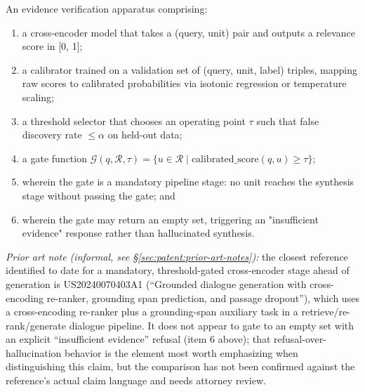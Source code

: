 \begin{claim}
\label{claim:evidence-gate}
An evidence verification apparatus comprising:
\begin{enumerate}
  \item a cross-encoder model that takes a (query, unit) pair and outputs a relevance score in [0, 1];
  \item a calibrator trained on a validation set of (query, unit, label) triples, mapping raw scores to calibrated probabilities via isotonic regression or temperature scaling;
  \item a threshold selector that chooses an operating point $\tau$ such that false discovery rate $\leq \alpha$ on held-out data;
  \item a gate function $\mathcal{G}(q, \mathcal{R}, \tau) = \{ u \in \mathcal{R} \mid \text{calibrated\_score}(q, u) \geq \tau \}$;
  \item wherein the gate is a mandatory pipeline stage: no unit reaches the synthesis stage without passing the gate; and
  \item wherein the gate may return an empty set, triggering an "insufficient evidence" response rather than hallucinated synthesis.
\end{enumerate}
\end{claim}

\par\noindent\emph{Prior art note (informal, see \S\ref{sec:patent:prior-art-notes}):} the closest reference identified to date for a mandatory, threshold-gated cross-encoder stage ahead of generation is US20240070403A1 (``Grounded dialogue generation with cross-encoding re-ranker, grounding span prediction, and passage dropout''), which uses a cross-encoding re-ranker plus a grounding-span auxiliary task in a retrieve/re-rank/generate dialogue pipeline. It does not appear to gate to an empty set with an explicit ``insufficient evidence'' refusal (item 6 above); that refusal-over-hallucination behavior is the element most worth emphasizing when distinguishing this claim, but the comparison has not been confirmed against the reference's actual claim language and needs attorney review.

